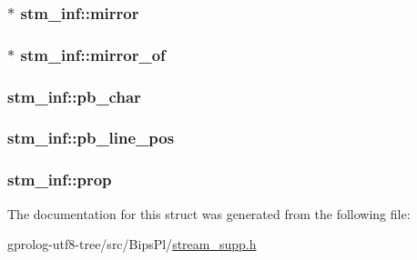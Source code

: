 \subsubsection[{\texorpdfstring{mirror}{mirror}}]{$\ast$ stm\+\_\+inf\+::mirror}\hypertarget{structstm__inf_a2e13c8b109418f635fabba678006c6cd}{}\label{structstm__inf_a2e13c8b109418f635fabba678006c6cd}
\subsubsection[{\texorpdfstring{mirror\+\_\+of}{mirror_of}}]{$\ast$ stm\+\_\+inf\+::mirror\+\_\+of}\hypertarget{structstm__inf_ada3cbffaa477959332fc96000cc4b73e}{}\label{structstm__inf_ada3cbffaa477959332fc96000cc4b73e}
\subsubsection[{\texorpdfstring{pb\+\_\+char}{pb_char}}]{ stm\+\_\+inf\+::pb\+\_\+char}\hypertarget{structstm__inf_af66229bdb1421dc62daaee808af84bba}{}\label{structstm__inf_af66229bdb1421dc62daaee808af84bba}
\subsubsection[{\texorpdfstring{pb\+\_\+line\+\_\+pos}{pb_line_pos}}]{ stm\+\_\+inf\+::pb\+\_\+line\+\_\+pos}\hypertarget{structstm__inf_acd4b4b0e220c45642fb4a6903d6ec4d5}{}\label{structstm__inf_acd4b4b0e220c45642fb4a6903d6ec4d5}
\subsubsection[{\texorpdfstring{prop}{prop}}]{ stm\+\_\+inf\+::prop}\hypertarget{structstm__inf_a5b984f4df0d32f07741b75dced7453aa}{}\label{structstm__inf_a5b984f4df0d32f07741b75dced7453aa}


The documentation for this struct was generated from the following file\+:\begin{DoxyCompactItemize}
\item 
gprolog-\/utf8-\/tree/src/\+Bips\+Pl/\hyperlink{stream__supp_8h}{stream\+\_\+supp.\+h}\end{DoxyCompactItemize}
